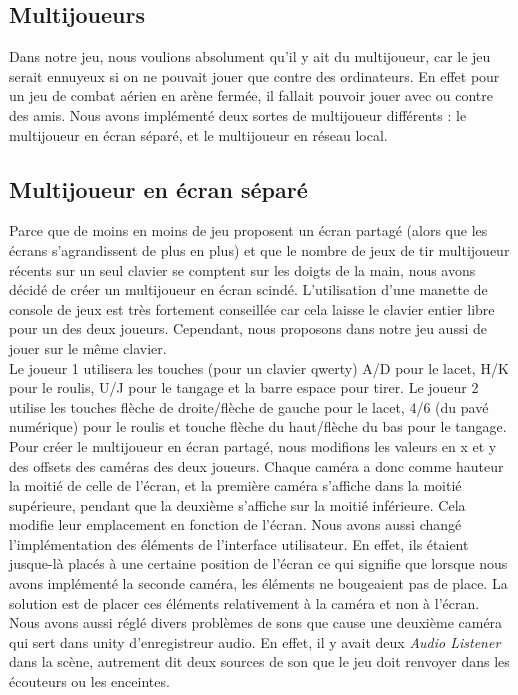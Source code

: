 \documentclass[12pt, titlepage]{article}
\begin{document}
\begin{spacing}{1.5}
\newpage
\section{Multijoueurs}

Dans notre jeu, nous voulions absolument qu'il y ait du multijoueur, car le jeu serait ennuyeux si on ne pouvait jouer que contre des ordinateurs. En effet pour un jeu de combat aérien en arène fermée, il fallait pouvoir jouer avec ou contre des amis. Nous avons implémenté deux sortes de multijoueur différents : le multijoueur en écran séparé, et le multijoueur en réseau local.\\

\subsection{Multijoueur en écran séparé}

Parce que de moins en moins de jeu proposent un écran partagé (alors que les écrans s'agrandissent de plus en plus) et que le nombre de jeux de tir multijoueur récents sur un seul clavier se comptent sur les doigts de la main, nous avons décidé de créer un multijoueur en écran scindé. L'utilisation d'une manette de console de jeux est très fortement conseillée car cela laisse le clavier entier libre pour un des deux joueurs. Cependant, nous proposons dans notre jeu aussi de jouer sur le même clavier.\\

 Le joueur 1 utilisera les touches (pour un clavier qwerty) A/D pour le lacet, H/K pour le roulis, U/J pour le tangage et la barre espace pour tirer. Le joueur 2 utilise les touches flèche de droite/flèche de gauche pour le lacet, 4/6 (du pavé numérique) pour le roulis et touche flèche du haut/flèche du bas pour le tangage.\\

Pour créer le multijoueur en écran partagé, nous modifions les valeurs en x et y des offsets des caméras des deux joueurs. Chaque caméra a donc comme hauteur la moitié de celle de l'écran, et la première caméra s'affiche dans la moitié supérieure, pendant que la deuxième s'affiche sur la moitié inférieure. Cela modifie leur emplacement en fonction de l'écran. Nous avons aussi changé l'implémentation des éléments de l'interface utilisateur. En effet, ils étaient jusque-là placés à une certaine position de l'écran ce qui signifie que lorsque nous avons implémenté la seconde caméra, les éléments ne bougeaient pas de place. La solution est de placer ces éléments relativement à la caméra et non à l'écran. Nous avons aussi réglé divers problèmes de sons que cause une deuxième caméra qui sert dans unity d'enregistreur audio. En effet, il y avait deux \textit{Audio Listener} dans la scène, autrement dit deux sources de son que le jeu doit renvoyer dans les écouteurs ou les enceintes.\\


\end{spacing}
\end{document}
